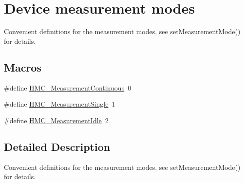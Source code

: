 \hypertarget{group___measurement_modes}{\section{Device measurement modes}
\label{group___measurement_modes}
}


Convenient definitions for the measurement modes, see {\ttfamily set\+Measurement\+Mode()} for details.  


\subsection*{Macros}
\begin{DoxyCompactItemize}
\item 
\#define \hyperlink{group___measurement_modes_gabb966e3ff4f28a70ad9dafba0c76ad26}{H\+M\+C\+\_\+\+Measurement\+Continuous}~0
\item 
\#define \hyperlink{group___measurement_modes_ga5282c8c798f223eb17c9adceb460dac9}{H\+M\+C\+\_\+\+Measurement\+Single}~1
\item 
\#define \hyperlink{group___measurement_modes_ga84a5c60197f92dd71fe1419740dbf7e2}{H\+M\+C\+\_\+\+Measurement\+Idle}~2
\end{DoxyCompactItemize}


\subsection{Detailed Description}
Convenient definitions for the measurement modes, see {\ttfamily set\+Measurement\+Mode()} for details. 



